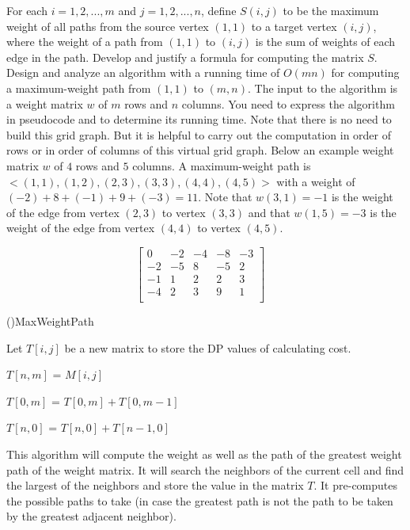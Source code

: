 \documentclass[11pt]{amsart}
\begin{document}
For each $i = 1, 2, ..., m$ and $j = 1, 2, ..., n$,
define $S(i, j)$ to be the maximum weight of all paths from the source vertex $(1, 1)$
to a target vertex $(i, j)$, where the weight of a path from $(1, 1)$
to $(i, j)$ is the sum of weights of each edge in the path.
Develop and justify a formula for computing the matrix $S$.
Design and analyze an algorithm with a running time of $O(mn)$
for computing a maximum-weight path from $(1, 1)$ to $(m, n)$.
The input to the algorithm is a weight matrix $w$ of $m$ rows and $n$ columns. 
You need to express the algorithm in pseudocode and to determine its running time.
Note that there is no need to build this grid graph. But it is helpful
to carry out the computation in order of rows or in order of columns of this virtual grid graph. 
Below an example weight matrix $w$ of $4$ rows and $5$ columns.
A maximum-weight path is $<(1, 1), (1, 2), (2, 3), (3, 3), (4, 4), (4, 5)>$
with a weight of $(-2) + 8 + (-1) + 9 + (-3) = 11$.
Note that $w(3, 1) = -1$ is the weight of the edge from vertex $(2, 3)$ to vertex $(3, 3)$
and  that $w(1, 5) = -3$ is the weight of the edge from vertex $(4, 4)$ to vertex $(4, 5)$.

$$
\begin{bmatrix} 
0  & -2 & -4 & -8 & -3 \\
-2 & -5 & 8  & -5 & 2  \\
-1 & 1  & 2  &  2 & 3  \\
-4 & 2  & 3  &  9 & 1  \\
\end{bmatrix}
\quad
$$
\newpage
\begin{algorithm}[H]
    \Fn(){MaxWeightPath}{
    \SetAlgoLined
    \SetNoFillComment
    \DontPrintSemicolon
        Let $T[i, j]$ be a new matrix to store the DP values of calculating cost.\\
         {
             {
                $T[n, m]$ = $M[i, j]$
            }

             {
                $T[0, m]$ = $T[0, m] + T[0, m - 1]$
            }

             {
                $T[n, 0]$ = $T[n, 0] + T[n - 1, 0]$
            }

        }
    }
    \end{algorithm}
\bigskip
\hspace*{15mm}This algorithm will compute the weight as well as the path of the greatest weight path of the weight matrix. It will search the neighbors of the current cell and find the largest of the neighbors and store the value in the matrix $T$. It pre-computes the possible paths to take (in case the greatest path is not the path to be taken by the greatest adjacent neighbor).
\newpage
\end{document}
